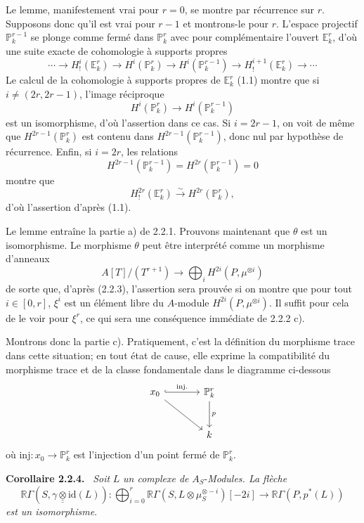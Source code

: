 \documentclass[11pt]{article}
\newenvironment{statement}[1]{\par\medskip\noindent\textbf{#1.}\ }{\par\medskip}
\newcommand{\R}{\mathbb{R}}\newcommand{\RHomCore}{\mathbb{R}\mathrm{Hom}}
\providecommand{\R}{\mathrm R}
\begin{document}
Le lemme, manifestement vrai pour $r=0$, se montre par récurrence sur $r$. Supposons donc qu'il est vrai pour $r-1$ et montrons-le pour $r$. L'espace projectif $\mathbb P_k^{r-1}$ se plonge comme fermé dans $\mathbb P_k^r$ avec pour complémentaire l'ouvert $\mathbb E_k^r$, d'où une suite exacte de cohomologie à supports propres
\[
\cdots\longrightarrow H_!^i(\mathbb E_k^r)\longrightarrow H^i(\mathbb P_k^r)
\longrightarrow H^i(\mathbb P_k^{r-1})\longrightarrow H_!^{i+1}(\mathbb E_k^r)\longrightarrow\cdots
\]
Le calcul de la cohomologie à supports propres de $\mathbb E_k^r$ (1.1) montre que si $i\ne(2r,2r-1)$, l'image réciproque
\[
H^i(\mathbb P_k^r)\longrightarrow H^i(\mathbb P_k^{r-1})
\]
est un isomorphisme, d'où l'assertion dans ce cas. Si $i=2r-1$, on voit de même que $H^{2r-1}(\mathbb P_k^r)$ est contenu dans $H^{2r-1}(\mathbb P_k^{r-1})$, donc nul par hypothèse de récurrence. Enfin, si $i=2r$, les relations
\[
H^{2r-1}(\mathbb P_k^{r-1})=H^{2r}(\mathbb P_k^{r-1})=0
\]
montre que
\[
H_!^{2r}(\mathbb E_k^r)\xrightarrow{\sim}H^{2r}(\mathbb P_k^r),
\]
d'où l'assertion d'après (1.1).

Le lemme entraîne la partie a) de 2.2.1. Prouvons maintenant que $\theta$ est un isomorphisme. Le morphisme $\theta$ peut être interprété comme un morphisme d'anneaux
\[
A[T]/(T^{r+1})\longrightarrow\bigoplus_i H^{2i}(P,\mu^{\otimes i})
\]
de
sorte que, d'après (2.2.3), l'assertion sera prouvée si on montre que pour tout $i\in[0,r]$, $\xi^i$ est un élément libre du $A$-module $H^{2i}(P,\mu^{\otimes i})$. Il suffit pour cela de le voir pour $\xi^r$, ce qui sera une conséquence immédiate de 2.2.2 c).

Montrons donc la partie c). Pratiquement, c'est la définition du morphisme trace dans cette situation; en tout état de cause, elle exprime la compatibilité du morphisme trace et de la classe fondamentale dans le diagramme ci-dessous
\[
\begin{tikzcd}[column sep=large,row sep=large]
x_0 \arrow[r,hook,"\mathrm{inj.}"] \arrow[dr] & \mathbb P^r_k \arrow[d,"p"]\\
& k
\end{tikzcd}
\]
où $\mathrm{inj}:x_0\to \mathbb P^r_k$ est l'injection d'un point fermé de $\mathbb P^r_k$.

\begin{statement}{Corollaire 2.2.4}
\emph{Soit} $L$ \emph{un complexe de} $A_S$-\emph{Modules. La flèche}
\[
\R\Gamma(S,\gamma\mathbin{\underline{\underline{\otimes}}}\mathrm{id}(L)):
\bigoplus_{i=0}^r \R\Gamma(S,L\otimes\mu_S^{\otimes -i})[-2i]
\longrightarrow
\R\Gamma(P,p^*(L))
\]
\emph{est un isomorphisme}.
\end{statement}
\end{document}
